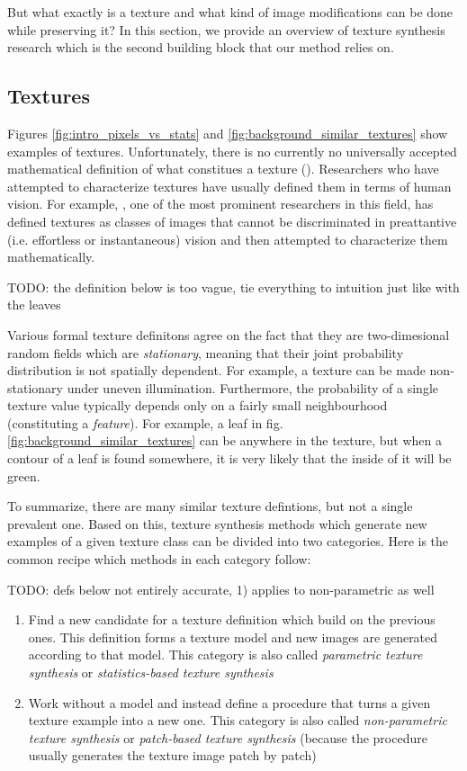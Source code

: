But what exactly is a texture and what kind of image modifications can be done while preserving it? In this section, we provide an overview of texture synthesis research which is the second building block that our method relies on.

\subsection{Textures}
\label{section:background-texture_synthesis-textures}

Figures \ref{fig:intro_pixels_vs_stats} and \ref{fig:background_similar_textures} show examples of textures. Unfortunately, there is no currently no universally accepted mathematical definition of what constitues a texture (\citet{Raad2018}). Researchers who have attempted to characterize textures have usually defined them in terms of human vision. For example, \citet{Julesz1962}, one of the most prominent researchers in this field, has defined textures as classes of images that cannot be discriminated in preattantive (i.e. effortless or instantaneous) vision and then attempted to characterize them mathematically.

{\color{red} TODO: the definition below is too vague, tie everything to intuition just like with the leaves}

Various formal texture definitons agree on the fact that they are two-dimesional random fields which are \textit{stationary}, meaning that their joint probability distribution is not spatially dependent. For example, a texture can be made non-stationary under uneven illumination. Furthermore, the probability of a single texture value typically depends only on a fairly small neighbourhood (constituting a \textit{feature}). For example, a leaf in fig. \ref{fig:background_similar_textures} can be anywhere in the texture, but when a contour of a leaf is found somewhere, it is very likely that the inside of it will be green.

To summarize, there are many similar texture defintions, but not a single prevalent one. Based on this, texture synthesis methods which generate new examples of a given texture class can be divided into two categories. Here is the common recipe which methods in each category follow:

{\color{red} TODO: defs below not entirely accurate, 1) applies to non-parametric as well}

\begin{enumerate}
    \item Find a new candidate for a texture definition which build on the previous ones. This definition forms a texture model and new images are generated according to that model. This category is also called \textit{parametric texture synthesis} or \textit{statistics-based texture synthesis}
    \item Work without a model and instead define a procedure that turns a given texture example into a new one. This category is also called \textit{non-parametric texture synthesis} or \textit{patch-based texture synthesis} (because the procedure usually generates the texture image patch by patch)
\end{enumerate}

